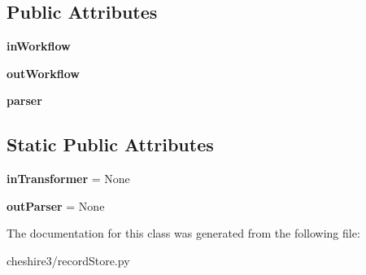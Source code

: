 \subsection*{Public Attributes}
\begin{DoxyCompactItemize}
\item 
\hypertarget{classcheshire3_1_1record_store_1_1_simple_record_store_a625f33f5d55fbd4e2737ee474dd50d17}{{\bfseries in\-Workflow}}\label{classcheshire3_1_1record_store_1_1_simple_record_store_a625f33f5d55fbd4e2737ee474dd50d17}

\item 
\hypertarget{classcheshire3_1_1record_store_1_1_simple_record_store_a58287f4147b1f38e12946972614bd22a}{{\bfseries out\-Workflow}}\label{classcheshire3_1_1record_store_1_1_simple_record_store_a58287f4147b1f38e12946972614bd22a}

\item 
\hypertarget{classcheshire3_1_1record_store_1_1_simple_record_store_ae4ea92e229fc83b54390259ffa90f0ab}{{\bfseries parser}}\label{classcheshire3_1_1record_store_1_1_simple_record_store_ae4ea92e229fc83b54390259ffa90f0ab}

\end{DoxyCompactItemize}
\subsection*{Static Public Attributes}
\begin{DoxyCompactItemize}
\item 
\hypertarget{classcheshire3_1_1record_store_1_1_simple_record_store_ab4cb87d5819775df25dc76bba6dd0027}{{\bfseries in\-Transformer} = None}\label{classcheshire3_1_1record_store_1_1_simple_record_store_ab4cb87d5819775df25dc76bba6dd0027}

\item 
\hypertarget{classcheshire3_1_1record_store_1_1_simple_record_store_ab8b16eb26e0656c1b70583785f0b22d0}{{\bfseries out\-Parser} = None}\label{classcheshire3_1_1record_store_1_1_simple_record_store_ab8b16eb26e0656c1b70583785f0b22d0}

\end{DoxyCompactItemize}


The documentation for this class was generated from the following file\-:\begin{DoxyCompactItemize}
\item 
cheshire3/record\-Store.\-py\end{DoxyCompactItemize}
